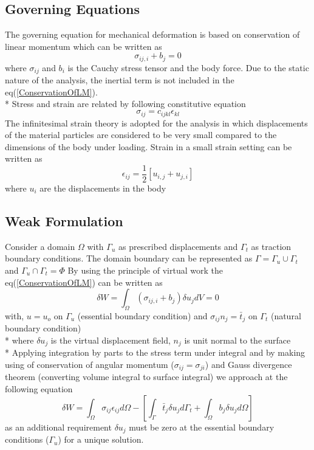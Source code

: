 \documentclass[11pt]{article}
\begin{document}
\subsection{Governing Equations}
The governing equation for mechanical deformation is based on conservation of
linear momentum which can be written as
\begin{equation}\label{ConservationOfLM}
\sigma_{ij,i} + b_j = 0
\end{equation}
where $ \sigma_{ij} $ and $ b_i $ is the Cauchy stress tensor and the body force.
Due to the static nature of the analysis, the inertial term is not included in
the eq(\ref{ConservationOfLM}).\\*
Stress and strain are related by following constitutive equation
\begin{equation}
\sigma_{ij} = c_{ijkl} \epsilon_{kl}
\end{equation}
The infinitesimal strain theory is adopted for the analysis in which
displacements of the material particles are considered to be very small compared
to the dimensions of the body under loading. Strain in a small strain setting
can be written as
\begin{equation}
\epsilon_{ij}=\frac{1}{2}[u_{i,j}+u_{j,i}]
\end{equation}
where $ u_{i} $ are the displacements in the body


\subsection{Weak Formulation}
Consider a domain $\Omega$ with $\Gamma_u$ as prescribed displacements and
$\Gamma_t$ as traction boundary conditions. The domain boundary can be
represented as $\Gamma = \Gamma_u \cup \Gamma_t$ and $\Gamma_u \cap \Gamma_t =
\Phi$
By using the principle of virtual work the eq(\ref{ConservationOfLM}) can be written as
\begin{equation}
\delta W = \int_\Omega (\sigma_{ij,i} + b_j ) \delta u_j dV = 0
\end{equation} 
with,
$u = u_o$ on $\Gamma_u$ (essential boundary condition) and
$\sigma_{ij}n_j = \bar{t}_j$ on $\Gamma_t$ (natural boundary condition) \\*
where $\delta u_j$ is the virtual displacement field, $n_j$ is unit normal to
the surface \\*
Applying integration by parts to the stress term under integral and by making
using of conservation of angular momentum ($ \sigma_{ij} = \sigma_{ji} $) and
Gauss divergence theorem (converting volume integral to surface integral) we
approach at the following equation
\begin{equation} \label{FinalWeakform}
\delta W = \int_{\Omega} \sigma_{ij} \epsilon_{ij} d\Omega - \left[
\int_{\Gamma} \bar{t}_j \delta u_j d\Gamma_t  + \int_{\Omega} b_j \delta u_j
d\Omega \right]
\end{equation}
as an additional requirement $\delta u_j$ must be zero at the essential boundary
conditions ($\Gamma_u$) for a unique solution.
\end{document}
